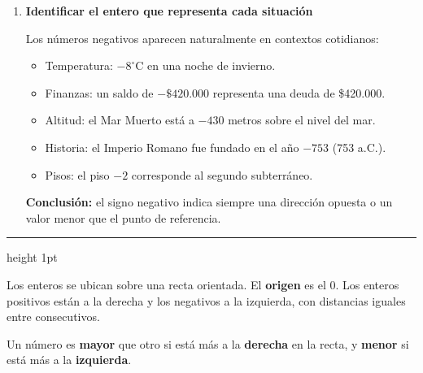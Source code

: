 \documentclass[11pt, letterpaper]{article}
\newcommand{\subbloque}[1]{%
  \vspace{14pt}
  \noindent{\large\bfseries\color{zenitnavy} #1}\par
  \vspace{4pt}\hrule height 1pt\vspace{8pt}}
\begin{document}
\begin{tcolorbox}[examplebox, title={Ejemplos --- contextos reales con n\'umeros negativos}]
\begin{enumerate}[label=\textbf{Ej. \arabic*.}, leftmargin=*, itemsep=12pt]

\item \textbf{Identificar el entero que representa cada situaci\'on}

Los n\'umeros negativos aparecen naturalmente en contextos cotidianos:
\begin{itemize}[itemsep=3pt]
  \item Temperatura: $-8^\circ$C en una noche de invierno.
  \item Finanzas: un saldo de $-\$420.000$ representa una deuda de \$420.000.
  \item Altitud: el Mar Muerto est\'a a $-430$ metros sobre el nivel del mar.
  \item Historia: el Imperio Romano fue fundado en el a\~no $-753$ (753 a.C.).
  \item Pisos: el piso $-2$ corresponde al segundo subterr\'aneo.
\end{itemize}

\textbf{Conclusi\'on:} el signo negativo indica siempre una direcci\'on opuesta o un valor menor que el punto de referencia.

\end{enumerate}
\end{tcolorbox}

\subbloque{1.2 La recta num\'erica entera}
\label{sub:1.2}

\begin{tcolorbox}[importantbox, title={Representaci\'on en la recta num\'erica}]
Los enteros se ubican sobre una recta orientada. El \textbf{origen} es el 0. Los enteros positivos est\'an a la derecha y los negativos a la izquierda, con distancias iguales entre consecutivos.

\begin{center}
\end{center}

Un n\'umero es \textbf{mayor} que otro si est\'a m\'as a la \textbf{derecha} en la recta, y \textbf{menor} si est\'a m\'as a la \textbf{izquierda}.
\end{tcolorbox}
\end{document}
